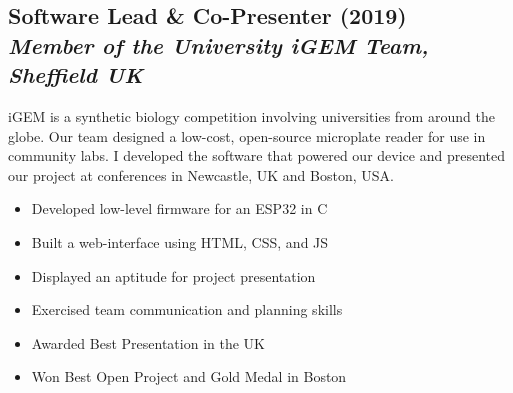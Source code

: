 \documentclass[twocolumn, a4paper, fontsize=9pt, headsepline, footsepline]{scrartcl}
\begin{document}

\subsection*{Software Lead \& Co-Presenter (2019)\\\vspace{-3pt}\textmd{\emph{Member of the
    University iGEM Team, Sheffield UK}}}
\noindent
iGEM is a synthetic biology competition involving universities from around the
globe. Our team designed a low-cost, open-source microplate reader for use in
community labs. I developed the software that powered our device and presented
our project at conferences in Newcastle, UK and Boston, USA.
\begin{itemize}
\item Developed low-level firmware for an ESP32 in C
\item Built a web-interface using HTML, CSS, and JS
\item Displayed an aptitude for project presentation
\item Exercised team communication and planning skills
\item Awarded Best Presentation in the UK
\item Won Best Open Project and Gold Medal in Boston
\end{itemize}
\end{document}
